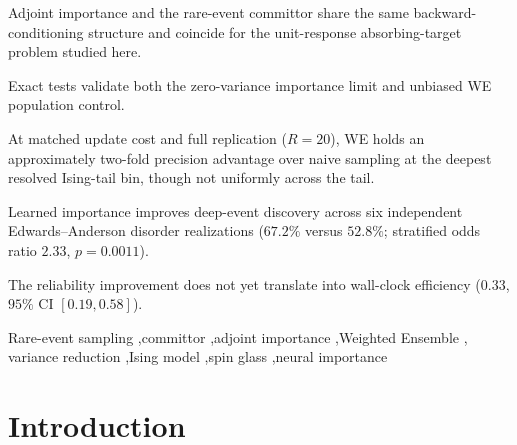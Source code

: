 \documentclass[a4paper,fleqn]{cas-sc}
\begin{document}
\begin{highlights}
\item Adjoint importance and the rare-event committor share the same backward-conditioning
structure and coincide for the unit-response absorbing-target problem studied here.
\item Exact tests validate both the zero-variance importance limit and unbiased WE population
control.
\item At matched update cost and full replication ($R=20$), WE holds an approximately
two-fold precision advantage over naive sampling at the deepest resolved Ising-tail bin,
though not uniformly across the tail.
\item Learned importance improves deep-event discovery across six independent
Edwards--Anderson disorder realizations ($67.2\%$ versus $52.8\%$; stratified odds ratio $2.33$,
$p=0.0011$).
\item The reliability improvement does not yet translate into wall-clock efficiency
($0.33$, $95\%$ CI $[0.19,0.58]$).
\end{highlights}

\begin{keywords}
Rare-event sampling \sep committor \sep adjoint importance \sep Weighted Ensemble \sep
variance reduction \sep Ising model \sep spin glass \sep neural importance
\end{keywords}

\maketitle

\section{Introduction}\label{sec:intro}
\end{document}
